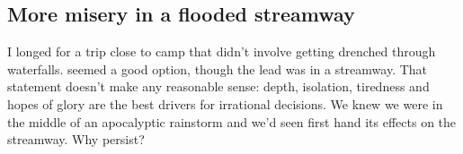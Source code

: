 
\subsection{More misery in a flooded streamway}
\begin{marginfigure}
\end{marginfigure}
I longed for a trip close to camp that didn't involve getting drenched through waterfalls.  seemed a good option, though the lead was in a streamway. That statement doesn't make any reasonable sense: depth, isolation, tiredness and hopes of glory are the best drivers for irrational decisions. We knew we were in the middle of an apocalyptic rainstorm and we'd seen first hand its effects on the  streamway. Why persist?

